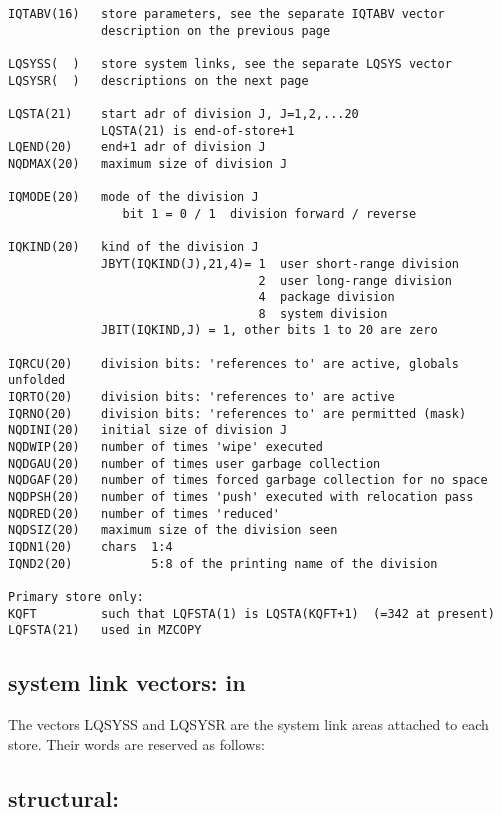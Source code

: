 \begin{verbatim}
IQTABV(16)   store parameters, see the separate IQTABV vector
             description on the previous page

LQSYSS(  )   store system links, see the separate LQSYS vector
LQSYSR(  )   descriptions on the next page

LQSTA(21)    start adr of division J, J=1,2,...20
             LQSTA(21) is end-of-store+1
LQEND(20)    end+1 adr of division J
NQDMAX(20)   maximum size of division J

IQMODE(20)   mode of the division J
                bit 1 = 0 / 1  division forward / reverse

IQKIND(20)   kind of the division J
             JBYT(IQKIND(J),21,4)= 1  user short-range division
                                   2  user long-range division
                                   4  package division
                                   8  system division
             JBIT(IQKIND,J) = 1, other bits 1 to 20 are zero

IQRCU(20)    division bits: 'references to' are active, globals unfolded
IQRTO(20)    division bits: 'references to' are active
IQRNO(20)    division bits: 'references to' are permitted (mask)
NQDINI(20)   initial size of division J
NQDWIP(20)   number of times 'wipe' executed
NQDGAU(20)   number of times user garbage collection
NQDGAF(20)   number of times forced garbage collection for no space
NQDPSH(20)   number of times 'push' executed with relocation pass
NQDRED(20)   number of times 'reduced'
NQDSIZ(20)   maximum size of the division seen
IQDN1(20)    chars  1:4
IQND2(20)           5:8 of the printing name of the division

Primary store only:
KQFT         such that LQFSTA(1) is LQSTA(KQFT+1)  (=342 at present)
LQFSTA(21)   used in MZCOPY
\end{verbatim} 

\subsection*{ system link vectors: in }

The vectors LQSYSS and LQSYSR are the system link areas
attached to each store.
Their words are reserved as follows:


\subsection*{structural: }

